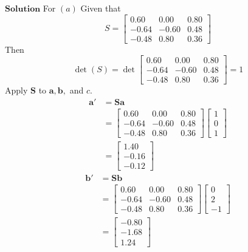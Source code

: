 $\boxed{\textbf{Solution}}$ For $(a)$ Given that
$$S=\begin{bmatrix}0.60 & 0.00 & 0.80 \\ -0.64 & -0.60 & 0.48 \\ -0.48 & 0.80 & 0.36\end{bmatrix}$$
Then
$$
\operatorname{det}(S)=\operatorname{det}\begin{bmatrix}
0.60 & 0.00 & 0.80 \\
-0.64 & -0.60 & 0.48 \\
-0.48 & 0.80 & 0.36
\end{bmatrix}=1
$$
Apply $\mathbf{S}$ to $\mathbf{a}, \mathbf{b},$ and $c$.
$$
\begin{aligned}
\mathbf{a}' &=\mathbf{S} \mathbf{a} \\
&=\begin{bmatrix}
0.60 & 0.00 & 0.80 \\
-0.64 & -0.60 & 0.48 \\
-0.48 & 0.80 & 0.36
\end{bmatrix}\begin{bmatrix}
1 \\
0 \\
1
\end{bmatrix} \\
&=\begin{bmatrix}
1.40 \\
-0.16 \\
-0.12
\end{bmatrix}
\end{aligned}
$$
$$
\begin{aligned}
\mathbf{b}' &=\mathbf{S} \mathbf{b} \\
&=\begin{bmatrix}
0.60 & 0.00 & 0.80 \\
-0.64 & -0.60 & 0.48 \\
-0.48 & 0.80 & 0.36
\end{bmatrix}\begin{bmatrix}
0 \\
2 \\
-1
\end{bmatrix} \\
&=\begin{bmatrix}
-0.80 \\
-1.68 \\
1.24
\end{bmatrix}
\end{aligned}
$$
